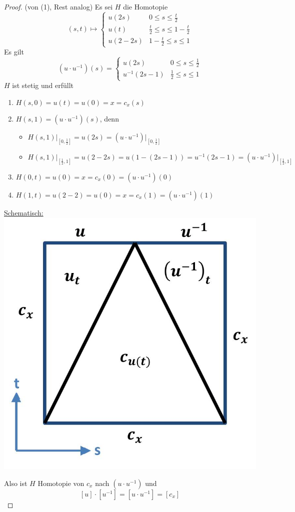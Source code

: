 \documentclass[a4paper,11pt,notitlepage]{report}
\begin{document}
\begin{proof} (von (1), Rest analog)
\newline
Es sei $H$ die Homotopie 
$$(s,t) \mapsto \begin{cases} u(2s) & 0 \leq s \leq \frac{t}{2} \\ u(t) & \frac{t}{2} \leq s \leq 1- \frac{t}{2} \\ u(2-2s) & 1-\frac{t}{2} \leq s \leq 1 \end{cases}$$
Es gilt 
$$(u \cdot u^{-1})(s) = \begin{cases} u(2s) & 0 \leq s \leq \frac{1}{2} \\ u^{-1}(2s-1) & \frac{1}{2} \leq s \leq 1 \end{cases}$$
$H$ ist stetig und erfüllt
\begin{enumerate}
	\item $H(s,0) = u(t) = u(0) = x = c_x(s)$
	\item $H(s,1) = (u \cdot u^{-1})(s)$, denn
	\begin{itemize}
		\item $H(s,1) \big |_{[0, \frac{1}{2}]} = u(2s) = (u \cdot u^{-1}) \big |_{[0, \frac{1}{2}]}$
		\item $H(s,1) \big |_{[\frac{1}{2},1]} = u(2-2s) = u(1-(2s-1)) = u^{-1}(2s-1) = (u \cdot u^{-1}) \big |_{[\frac{1}{2},1]}$  
	\end{itemize}
	\item $H(0,t) = u(0) = x = c_x(0) = (u \cdot u^{-1})(0)$
	\item $H(1,t) = u(2-2) = u(0) = x = c_x(1) = (u \cdot u^{-1})(1)$
\end{enumerate}

\underline{Schematisch:} \includegraphics[scale=0.4]{images/Beweis_Produkt_Lemma.jpg}

Also ist $H$ Homotopie von $c_x$ nach $(u \cdot u^{-1})$ und $$[u] \cdot [u^{-1}] = [u \cdot u^{-1}] = [c_x]$$
\end{proof}
\end{document}

